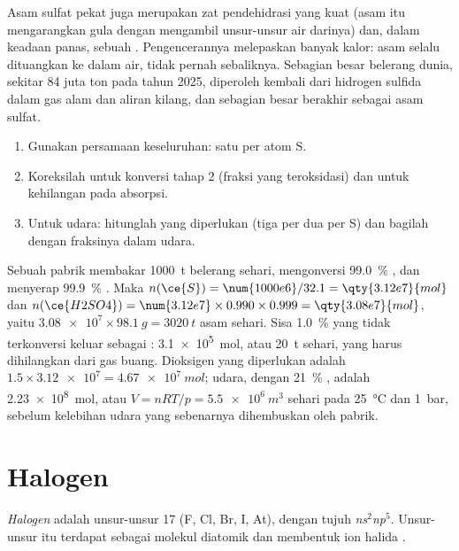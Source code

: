 Asam sulfat pekat juga merupakan zat pendehidrasi yang kuat (asam itu
mengarangkan gula dengan mengambil unsur-unsur air darinya) dan, dalam
keadaan panas, sebuah . Pengencerannya melepaskan banyak kalor:
asam selalu dituangkan ke dalam air, tidak pernah sebaliknya. Sebagian
besar belerang dunia, sekitar 84 juta ton pada tahun 2025, diperoleh
kembali dari hidrogen sulfida dalam gas alam dan aliran kilang, dan
sebagian besar berakhir sebagai asam sulfat.

\begin{method}\label{met:b1:p-block-16-18:contact-balance}
\begin{enumerate}
  \item Gunakan persamaan keseluruhan: satu  per atom S.
  \item Koreksilah untuk konversi tahap 2 (fraksi  yang
        teroksidasi) dan untuk kehilangan pada absorpsi.
  \item Untuk udara: hitunglah  yang diperlukan (tiga per dua per
        S) dan bagilah dengan fraksinya dalam udara.
\end{enumerate}
\end{method}

\begin{example}
Sebuah pabrik membakar \qty{1000}{t} belerang sehari, mengonversi
\qty{99.0}{\percent} , dan menyerap \qty{99.9}{\percent} .
Maka
$n(\ce{S}) = \num{1000e6}/32.1 = \qty{3.12e7}{mol}$ dan
$n(\ce{H2SO4}) = \num{3.12e7} \times 0.990 \times 0.999
= \qty{3.08e7}{mol}$, yaitu $\num{3.08e7} \times \qty{98.1}{g}
= \qty{3020}{t}$ asam sehari. Sisa \qty{1.0}{\percent} yang tidak
terkonversi keluar sebagai : \qty{3.1e5}{mol}, atau \qty{20}{t}
sehari, yang harus dihilangkan dari gas buang. Dioksigen yang diperlukan
adalah $1.5 \times \num{3.12e7} =
\qty{4.67e7}{mol}$; udara, dengan \qty{21}{\percent} , adalah
\qty{2.23e8}{mol}, atau $V = nRT/p = \qty{5.5e6}{m^3}$ sehari pada
\qty{25}{\celsius} dan \qty{1}{bar}, sebelum kelebihan udara yang
sebenarnya dihembuskan oleh pabrik.
\end{example}

\section{Halogen}

\begin{definition}[Halogen]\label{def:b1:p-block-16-18:halogen}
\emph{Halogen} adalah unsur-unsur  17 (F, Cl, Br,
I, At), dengan tujuh  \textit{ns}$^2$\textit{np}$^5$.
Unsur-unsur itu terdapat sebagai molekul diatomik  dan membentuk
ion halida .
\end{definition}

